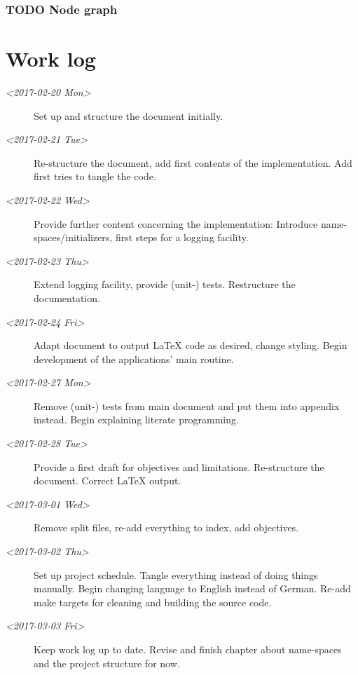 \documentclass[10pt, openright, notitlepage]{scrreprt}
\begin{document}
\subsection{{\bfseries\sffamily TODO} Node graph}
\label{sec:org8f3d3a2}
\chapter{Work log}
\label{sec:orgb2cb4f2}
\begin{description}
\item[{\textit{<2017-02-20 Mon>}}] Set up and structure the document initially.

\item[{\textit{<2017-02-21 Tue>}}] Re-structure the document, add first contents of the
implementation. Add first tries to tangle the code.

\item[{\textit{<2017-02-22 Wed>}}] Provide further content concerning the implementation:
Introduce name-spaces/initializers, first steps for a logging facility.

\item[{\textit{<2017-02-23 Thu>}}] Extend logging facility, provide (unit-) tests.
Restructure the documentation.

\item[{\textit{<2017-02-24 Fri>}}] Adapt document to output \LaTeX{} code as desired, change
styling. Begin development of the applications' main routine.

\item[{\textit{<2017-02-27 Mon>}}] Remove (unit-) tests from main document and put them into
appendix instead. Begin explaining literate programming.

\item[{\textit{<2017-02-28 Tue>}}] Provide a first draft for objectives and limitations.
Re-structure the document. Correct \LaTeX{} output.

\item[{\textit{<2017-03-01 Wed>}}] Remove split files, re-add everything to index, add
objectives.

\item[{\textit{<2017-03-02 Thu>}}] Set up project schedule. Tangle everything instead of
doing things manually. Begin changing language to English instead of German.
Re-add make targets for cleaning and building the source code.

\item[{\textit{<2017-03-03 Fri>}}] Keep work log up to date. Revise and finish chapter about
name-spaces and the project structure for now.


\end{description}
\end{document}
